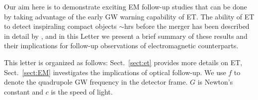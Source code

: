 \documentclass{aa}
\begin{document}
Our aim here is to demonstrate exciting EM follow-up studies that can be done by taking advantage of the early GW warning capability of ET. 
The ability of ET to detect inspiraling compact objects $\sim$hrs before the merger has been described in detail by \cite{Akcay18}, and in this Letter we 
present a brief summary of these results and their implications for follow-up observations of electromagnetic counterparts.

This letter is organized as follows: Sect.~\ref{sect:et} provides more details on ET,
Sect.~\ref{sect:EM} investigates the implications
of optical follow-up. %
We use $f$ to denote the quadrupole GW frequency
in the detector frame. $G$ is Newton's constant and $c$ is the speed of light.
\end{document}
